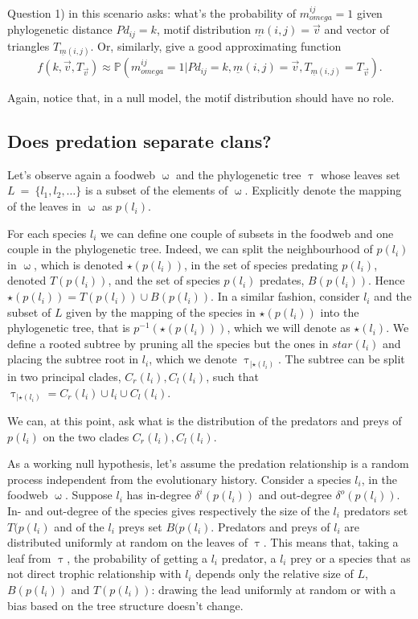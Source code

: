 \documentclass[12pt,a4paper]{report}
\begin{document}
Question 1) in this scenario asks: what's the probability of $m_{omega}^{ij} = 1$ given phylogenetic distance $Pd_{ij}=k$, motif distribution $\underline{m}(i,j)=\vec{v}$ and vector of triangles $T_{\underline{m}(i,j)}$. Or, similarly, give a good approximating function \[f(k,\vec{v},T_{\vec{v}}) \approx \mathbb{P}(m_{omega}^{ij} = 1 | Pd_{ij}=k, \underline{m}(i,j)=\vec{v}, T_{\underline{m}(i,j)}=T_{\vec{v}}).\]

Again, notice that, in a null model, the motif distribution should have no role.

\subsection{Does predation separate clans?}
Let's observe again a foodweb $\upomega$ and the phylogenetic tree $\uptau$ whose leaves set $L~=~\{l_1, l_2, \dots\}$ is a subset of the elements of $\upomega$. Explicitly denote the mapping of the leaves in $\upomega$ as $p(l_i)$. 

For each species $l_i$ we can define one couple of subsets in the foodweb and one couple in the phylogenetic tree. Indeed, we can split the neighbourhood of $p(l_i)$ in $\upomega$, which is denoted $\star(p(l_i))$, in the set of species predating $p(l_i)$, denoted $T(p(l_i))$, and the set of species $p(l_i)$ predates, $B(p(l_i))$. Hence $\star(p(l_i))= T(p(l_i)) \cup B(p(l_i))$. In a similar fashion, consider $l_i$ and the subset of $L$ given by the mapping of the species in $\star(p(l_i))$ into the phylogenetic tree, that is $p^{-1}(\star(p(l_i)))$, which we will denote as $\star(l_i)$. We define a rooted subtree by pruning all the species but the ones in $star(l_i)$ and placing the subtree root in $l_i$, which we denote  $\uptau_{|\star(l_i)}$. The subtree can be split in two principal clades, $C_r(l_i), C_l(l_i)$, such that $\uptau_{|\star(l_i)} = C_r(l_i) \cup l_i \cup C_l(l_i)$.

We can, at this point, ask what is the distribution of the predators and preys of $p(l_i)$ on the two clades $C_r(l_i), C_l(l_i)$.

As a working null hypothesis, let's assume the predation relationship is a random process independent from the evolutionary history. Consider a species $l_i$, in the foodweb $\upomega$. Suppose $l_i$ has in-degree $\delta^i(p(l_i))$ and out-degree $\delta^o(p(l_i))$. In- and out-degree of the species gives respectively the size of the $l_i$ predators set $T(p(l_i)$ and of the $l_i$ preys set $B(p(l_i)$. Predators and preys of $l_i$ are distributed uniformly at random on the leaves of $\uptau$. This means that, taking a leaf from $\uptau$, the probability of getting a $l_i$ predator, a $l_i$ prey or a species that as not direct trophic relationship with $l_i$ depends only the relative size of $L$, $B(p(l_i))$ and $T(p(l_i))$: drawing the lead uniformly at random or with a bias based on the tree structure doesn't change.
\end{document}
